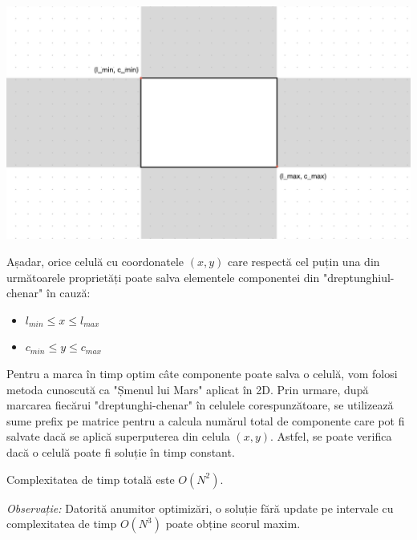 \documentclass[ro]{problem}
\begin{document}
\begin{center}
    \includegraphics[width=\textwidth]{foc-descriere-coverage.png}
\end{center}

\noindent Așadar, orice celulă cu coordonatele $(x, y)$ care respectă cel puțin una din următoarele proprietăți poate salva elementele componentei din "dreptunghiul-chenar" în cauză:
\begin{itemize}
\item $l_{min} \leq x \leq l_{max}$
\item $c_{min} \leq y \leq c_{max}$
\end{itemize}

\noindent Pentru a marca în timp optim câte componente poate salva o celulă, vom folosi metoda cunoscută ca "Șmenul lui Mars" aplicat în 2D. Prin urmare, după marcarea fiecărui "dreptunghi-chenar" în celulele corespunzătoare, se utilizează sume prefix pe matrice pentru a calcula numărul total de componente care pot fi salvate dacă se aplică superputerea din celula $(x, y)$. Astfel, se poate verifica dacă o celulă poate fi soluție în timp constant.

\noindent Complexitatea de timp totală este $O(N^2)$.

\emph{Observație:} Datorită anumitor optimizări, o soluție fără update pe intervale cu complexitatea de timp $O(N^3)$ poate obține scorul maxim.
\end{document}
